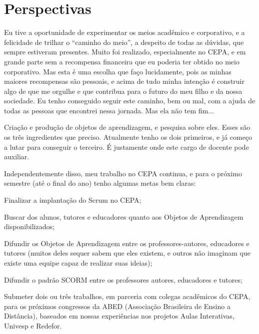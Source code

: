 \chapter{Perspectivas}

Eu tive a oportunidade de experimentar os meios acadêmico e corporativo, e a felicidade de trilhar o ``caminho do meio'', a despeito de todas as dúvidas, que sempre estiveram presentes. Muito foi realizado, especialmente no CEPA, e em grande parte sem a recompensa financeira que eu poderia ter obtido no meio corporativo. Mas esta é uma escolha que faço lucidamente, pois as minhas maiores recompensas são pessoais, e acima de tudo minha intenção é construir algo de que me orgulhe e que contribua para o futuro do meu filho e da nossa sociedade. Eu tenho conseguido seguir este caminho, bem ou mal, com a ajuda de todas as pessoas que encontrei nessa jornada. Mas ela não tem fim...

Criação e produção de objetos de aprendizagem, e pesquisa sobre eles. Esses são os três ingredientes que preciso. Atualmente tenho os dois primeiros, e já começo a lutar para conseguir o terceiro. É justamente onde este cargo de docente pode auxiliar. 

Independentemente disso, meu trabalho no CEPA continua, e para o próximo semestre (até o final do ano) tenho algumas metas bem claras:

\begin{compactitem}
	\item Finalizar a implantação do Scrum no CEPA;
	\item Buscar  dos alunos, tutores e educadores quanto aos Objetos de Aprendizagem disponibilizados;
	\item Difundir os Objetos de Aprendizagem entre os professores-autores, educadores e tutores (muitos deles sequer sabem que eles existem, e outros não imaginam que existe uma equipe capaz de realizar suas ideias);
	\item Difundir o padrão SCORM entre os professores autores, educadores e tutores;
	\item Submeter dois ou três trabalhos, em parceria com colegas acadêmicos do CEPA, para os próximos congressos da ABED (Associação Brasileira de Ensino a Distância), baseados em nossas experiências nos projetos Aulas Interativas, Univesp e Redefor.
\end{compactitem}
